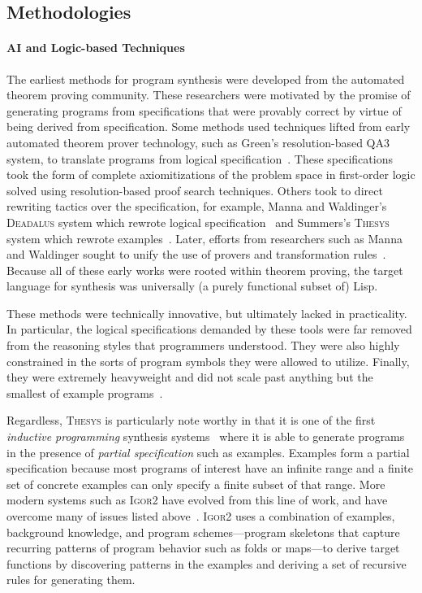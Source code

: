 \subsection{Methodologies}
\label{subsec:methodologies}

\paragraph{AI and Logic-based Techniques}

The earliest methods for program synthesis were developed from the automated theorem proving community.
These researchers were motivated by the promise of generating programs from specifications that were provably correct by virtue of being derived from specification.
Some methods used techniques lifted from early automated theorem prover technology, such as Green's resolution-based \textsc{QA3} system, to translate programs from logical specification~\citep{green-ijcai-1969}.
These specifications took the form of complete axiomitizations of the problem space in first-order logic solved using resolution-based proof search techniques.
Others took to direct rewriting tactics over the specification, for example, Manna and Waldinger's \textsc{Deadalus} system which rewrote logical specification~\citep{manna-tse-1979} and Summers's \textsc{Thesys} system which rewrote examples~\citep{summers-popl-1976}.
Later, efforts from researchers such as Manna and Waldinger sought to unify the use of provers and transformation rules~\citep{manna-plas-1980}.
Because all of these early works were rooted within theorem proving, the target language for synthesis was universally (a purely functional subset of) Lisp.

These methods were technically innovative, but ultimately lacked in practicality.
In particular, the logical specifications demanded by these tools were far removed from the reasoning styles that programmers understood.
They were also highly constrained in the sorts of program symbols they were allowed to utilize.
Finally, they were extremely heavyweight and did not scale past anything but the smallest of example programs~\citep{kreitz-automated-deduction-1998}.

Regardless, \textsc{Thesys} is particularly note worthy in that it is one of the first \emph{inductive programming} synthesis systems~\citep{kitzelmann-aaip-2010} where it is able to generate programs in the presence of \emph{partial specification} such as examples.
Examples form a partial specification because most programs of interest have an infinite range and a finite set of concrete examples can only specify a finite subset of that range.
More modern systems such as \textsc{Igor2} have evolved from this line of work, and have overcome many of issues listed above~\citep{kitzelmann-thesis-2010, hofmann-aaip-2010}.
\textsc{Igor2} uses a combination of examples, background knowledge, and program schemes---program skeletons that capture recurring patterns of program behavior such as folds or maps---to derive target functions by discovering patterns in the examples and deriving a set of recursive rules for generating them.

